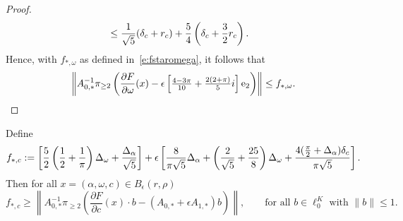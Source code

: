 \begin{proof}
\begin{alignat}{1}
	&\leq  \frac{1}{\sqrt{5}} ( \delta_c + r_c) + \frac{5}{4} \left(  \delta_c  + \frac{3}{2}r_c \right)  .  \label{e:longestimate}
	\end{alignat}
Hence, with $f_{*,\omega}$ as defined in~\eqref{e:fstaromega},
%
it follows that 	
	\[
	 \left\| A_{0,*}^{-1}  \pi_{\geq 2}\left( \frac{\partial F}{\partial \omega}(x) -  \epsilon \left[ \tfrac{4-3\pi}{10} + \tfrac{2(2 + \pi)}{5}i \right] \mathrm{e}_2  \right) \right\| \leq 	f_{*,\omega} .
		\]
	
	
	
\end{proof}



\begin{proposition}
			\label{prop:Zsc}
Define 
	\[
	f_{*,c} :=	\left[ \frac{5}{2} \left( \frac{1}{2} + \frac{1}{\pi} \right) \Delta_\omega +  \frac{\Delta_\alpha }{\sqrt{5}} \right] 
 +\epsilon \left[ \frac{8}{\pi \sqrt{5}} \Delta_\alpha + \left(  \frac{2}{\sqrt{5}}   + \frac{25}{8} \right) \Delta_\omega + \frac{4 (\tfrac{\pi}{2}+\Delta_\alpha)  \delta_c}{\pi \sqrt{5}} \right] .
	\]
	Then for all $x= (\alpha,\omega,c) \in B_\epsilon(r,\rho)$
	\[
	f_{*,c} \geq    \left\|  A_{0,*}^{-1} \pi_{\geq 2} \left( \frac{\partial F}{\partial c}(x) \cdot b  - (A_{0,*} + \epsilon A_{1,*}) b \right) 
	\right\| , \qquad\text{for all $b\in\ell^K_0$ with $\|b\| \leq 1$}.
	\]
\end{proposition}


